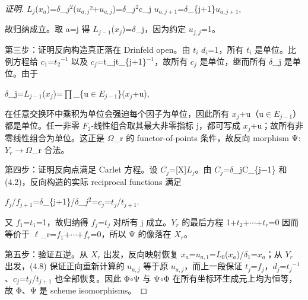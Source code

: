 \documentclass[11pt]{ctexart}
\begin{document}
\begin{proof}[证明]
\ensuremath{L_{j}}(\ensuremath{x_{a}})=\ensuremath{\delta}\_\ensuremath{j^2}(\ensuremath{u_{a,j}}²+\ensuremath{u_{a,j}})=\ensuremath{\delta}\_\ensuremath{j^2}c\_j \ensuremath{u_{a,j+1}}=\ensuremath{\delta}\_\{j+1\}\ensuremath{u_{a,j+1}},

故归纳成立。取 a=j 得 \ensuremath{L_{j−1}}(\ensuremath{x_{j}})=\ensuremath{\delta}\_j，因为约定 \ensuremath{u_{j,j}}=1。

第三步：证明反向构造真正落在 Drinfeld open。由 \ensuremath{t_{i}} \ensuremath{d_{i}}=1，所有 \ensuremath{t_{i}} 是单位。比例方程给 \ensuremath{c_1}=\ensuremath{t_2}\ensuremath{^{-1}} 以及 \ensuremath{c_{j}}=t\_jt\_\{j+1\}\ensuremath{^{-1}}，故所有 \ensuremath{c_{j}} 是单位，继而所有 \ensuremath{\delta}\_j 是单位。由于

\ensuremath{\delta}\_j=\ensuremath{L_{j−1}}(\ensuremath{x_{j}})=\ensuremath{\prod}\_\{u\ensuremath{\in}\ensuremath{E_{j−1}}\}(\ensuremath{x_{j}}+u),

在任意交换环中乘积为单位会强迫每个因子为单位，因此所有 \ensuremath{x_{j}}+u（u\ensuremath{\in}\ensuremath{E_{j−1}}）都是单位。任一非零 \ensuremath{F_2}-线性组合取其最大非零指标 j，都可写成 \ensuremath{x_{j}}+u；故所有非零线性组合为单位。这正是 \ensuremath{\Omega}\_r 的 functor-of-points 条件，故反向 morphism Ψ:\ensuremath{Y_{r}}\ensuremath{\to}\ensuremath{\Omega}\_r 合法。

第四步：证明反向点满足 Carlet 方程。设 \ensuremath{C_{j}}=[X]\ensuremath{L_{j}}。由 \ensuremath{C_{j}}=\ensuremath{\delta}\_jC\_\{j−1\} 和 (4.2)，反向构造的实际 reciprocal functions 满足

\ensuremath{f_{j}}/\ensuremath{f_{j+1}}=\ensuremath{\delta}\_\{j+1\}/\ensuremath{\delta}\_\ensuremath{j^2}=\ensuremath{c_{j}}=\ensuremath{t_{j}}/\ensuremath{t_{j+1}}.

又 \ensuremath{f_1}=\ensuremath{t_1}=1，故归纳得 \ensuremath{f_{j}}=\ensuremath{t_{j}} 对所有 j 成立。\ensuremath{Y_{r}} 的最后方程 1+\ensuremath{t_2}+\ensuremath{\cdots}+\ensuremath{t_{r}}=0 因而等价于 \ensuremath{\ell}\_r=\ensuremath{f_1}+\ensuremath{\cdots}+\ensuremath{f_{r}}=0，所以 Ψ 的像落在 \ensuremath{X_{r}}。

第五步：验证互逆。从 \ensuremath{X_{r}} 出发，反向映射恢复 \ensuremath{x_{a}}=\ensuremath{u_{a,1}}=\ensuremath{L_{0}}(\ensuremath{x_{a}})/\ensuremath{\ensuremath{\delta}_1}=\ensuremath{x_{a}}；从 \ensuremath{Y_{r}} 出发，(4.8) 保证正向重新计算的 \ensuremath{u_{a,j}} 等于原 \ensuremath{u_{a,j}}，而上一段保证 \ensuremath{t_{j}}=\ensuremath{f_{j}}，\ensuremath{d_{j}}=\ensuremath{t_{j}}\ensuremath{^{-1}}、\ensuremath{c_{j}}=\ensuremath{t_{j}}/\ensuremath{t_{j+1}} 也全部恢复。因此 Φ\ensuremath{\circ}Ψ 与 Ψ\ensuremath{\circ}Φ 在所有坐标环生成元上均为恒等，故 Φ、Ψ 是 scheme isomorphisms。

\end{proof}
\end{document}
